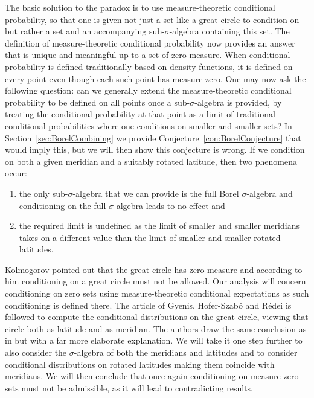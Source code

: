 \documentclass[a4paper]{report}
\theoremstyle{plain}
\theoremstyle{definition}
\theoremstyle{remark}
\numberwithin{equation}{chapter}
\DeclareMathOperator{\1}{\mathbbm{1}}
\begin{document}
The basic solution to the paradox is to use measure-theoretic conditional probability, so that one is given not just a set like a great circle to condition on but rather a set and an accompanying sub-$\sigma$-algebra containing this set. The definition of measure-theoretic conditional probability now provides an answer that is unique and meaningful up to a set of zero measure. When conditional probability is defined traditionally based on density functions, it is defined on every point even though each such point has measure zero. One may now ask the following question: can we generally extend the measure-theoretic conditional probability to be defined on all points once a sub-$\sigma$-algebra is provided, by treating the conditional probability at that point as a limit of traditional conditional probabilities where one conditions on smaller and smaller sets? In Section~\ref{sec:BorelCombining} we provide Conjecture~\ref{con:BorelConjecture} that would imply this, but we will then show this conjecture is wrong. If we condition on both a given meridian and a suitably rotated latitude, then two phenomena occur:
\begin{enumerate}
\item the only sub-$\sigma$-algebra that we can provide is the full Borel $\sigma$-algebra and conditioning on the full $\sigma$-algebra leads to no effect and
\item the required limit is undefined as the limit of smaller and smaller meridians takes on a different value than the limit of smaller and smaller rotated latitudes.
\end{enumerate}

Kolmogorov \cite{Kolmogorov33} pointed out that the great circle has zero measure and according to him conditioning on a great circle must not be allowed. Our analysis will concern conditioning on zero sets using measure-theoretic conditional expectations as such conditioning is defined there. The article of Gyenis, Hofer-Szabó and Rédei \cite{Gyenis17} is followed to compute the conditional distributions on the great circle, viewing that circle both as latitude and as meridian. The authors draw the same conclusion as in \cite{Kolmogorov33} but with a far more elaborate explanation. We will take it one step further to also consider the $\sigma$-algebra of both the meridians and latitudes and to consider conditional distributions on rotated latitudes making them coincide with meridians. We will then conclude that once again conditioning on measure zero sets must not be admissible, as it will lead to contradicting results.
\end{document}
